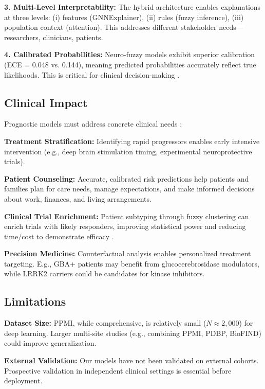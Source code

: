 \documentclass[conference]{IEEEtran}
\begin{document}
\textbf{3. Multi-Level Interpretability:} The hybrid architecture enables explanations at three levels: (i) features (GNNExplainer), (ii) rules (fuzzy inference), (iii) population context (attention). This addresses different stakeholder needs---researchers, clinicians, patients.

\textbf{4. Calibrated Probabilities:} Neuro-fuzzy models exhibit superior calibration (ECE = 0.048 vs. 0.144), meaning predicted probabilities accurately reflect true likelihoods. This is critical for clinical decision-making \cite{guo2017calibration}.

\subsection{Clinical Impact}

Prognostic models must address concrete clinical needs \cite{moons2012risk}:

\textbf{Treatment Stratification:} Identifying rapid progressors enables early intensive intervention (e.g., deep brain stimulation timing, experimental neuroprotective trials).

\textbf{Patient Counseling:} Accurate, calibrated risk predictions help patients and families plan for care needs, manage expectations, and make informed decisions about work, finances, and living arrangements.

\textbf{Clinical Trial Enrichment:} Patient subtyping through fuzzy clustering can enrich trials with likely responders, improving statistical power and reducing time/cost to demonstrate efficacy \cite{fereshtehnejad2017clinical}.

\textbf{Precision Medicine:} Counterfactual analysis enables personalized treatment targeting. E.g., GBA+ patients may benefit from glucocerebrosidase modulators, while LRRK2 carriers could be candidates for kinase inhibitors.

\subsection{Limitations}

\textbf{Dataset Size:} PPMI, while comprehensive, is relatively small ($N \approx 2,000$) for deep learning. Larger multi-site studies (e.g., combining PPMI, PDBP, BioFIND) could improve generalization.

\textbf{External Validation:} Our models have not been validated on external cohorts. Prospective validation in independent clinical settings is essential before deployment.
\end{document}
